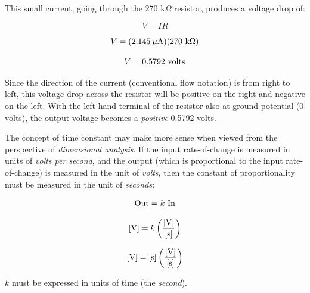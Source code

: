 This small current, going through the 270 k$\Omega$ resistor, produces a voltage drop of:

$$V = IR$$

$$V = (2.145 \> \mu \hbox{A})(270 \hbox{ k}\Omega)$$

$$V = 0.5792 \hbox{ volts}$$
 
Since the direction of the current (conventional flow notation) is from right to left, this voltage drop across the resistor will be positive on the right and negative on the left.  With the left-hand terminal of the resistor also at ground potential (0 volts), the output voltage becomes a {\it positive} 0.5792 volts.
 
\vskip 10pt

The concept of time constant may make more sense when viewed from the perspective of {\it dimensional analysis}.  If the input rate-of-change is measured in units of {\it volts per second}, and the output (which is proportional to the input rate-of-change) is measured in the unit of {\it volts}, then the constant of proportionality must be measured in the unit of {\it seconds}:

$$\hbox{Out} = k \hbox{ In}$$

$$\hbox{[V]} = k \left({\hbox{[V]} \over \hbox{[s]}}\right)$$

$$\hbox{[V]} = \hbox{[s]} \left({\hbox{[V]} \over \hbox{[s]}}\right)$$

$k$ must be expressed in units of time (the {\it second}).




